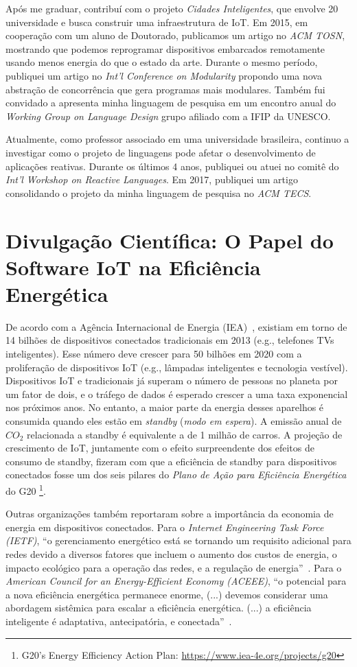 \documentclass[12pt,english]{amsart}
\begin{document}
Após me graduar, contribuí com o projeto \emph{Cidades Inteligentes}, que
envolve 20 universidade e busca construir uma infraestrutura de IoT.
%
Em 2015, em cooperação com um aluno de Doutorado, publicamos um artigo no
\emph{ACM TOSN}, mostrando que podemos reprogramar dispositivos embarcados
remotamente usando menos energia do que o estado da arte.
%
Durante o mesmo período, publiquei um artigo no
\emph{Int'l Conference on Modularity}
propondo uma nova abstração de concorrência que gera programas mais modulares.
%
Também fui convidado a apresenta minha linguagem de pesquisa em um encontro
anual do \emph{Working Group on Language Design} grupo afiliado com a IFIP da
UNESCO.

Atualmente, como professor associado em uma universidade brasileira, continuo
a investigar como o projeto de linguagens pode afetar o desenvolvimento de
aplicações reativas.
Durante os últimos 4 anos, publiquei ou atuei no comitê do
\emph{Int'l Workshop on Reactive Languages}.
Em 2017, publiquei um artigo consolidando o projeto da minha linguagem de
pesquisa no \emph{ACM TECS}.

\section{Divulgação Científica: O Papel do Software IoT na Eficiência Energética}

De acordo com a Agência Internacional de Energia (IEA)~\cite{iea.data},
existiam em torno de 14 bilhões de dispositivos conectados tradicionais em 2013
(e.g., telefones TVs inteligentes).
Esse número deve crescer para 50 bilhões em 2020 com a proliferação de
dispositivos IoT (e.g., lâmpadas inteligentes e tecnologia vestível).
%
Dispositivos IoT e tradicionais já superam o número de pessoas no planeta por
um fator de dois, e o tráfego de dados é esperado crescer a uma taxa
exponencial nos próximos anos.
%
No entanto, a maior parte da energia desses aparelhos é consumida quando eles
estão em \emph{standby} (\emph{modo em espera}).
%
A emissão anual de $CO_2$ relacionada a standby é equivalente a de 1 milhão de
carros.
%
A projeção de crescimento de IoT, juntamente com o efeito surpreendente dos
efeitos de consumo de standby, fizeram com que a eficiência de standby para
dispositivos conectados fosse um dos seis pilares do \emph{Plano de Ação para
Eficiência Energética} do G20%
\footnote{G20's Energy Efficiency Action Plan: \url{https://www.iea-4e.org/projects/g20}}.

Outras organizações também reportaram sobre a importância da economia de
energia em dispositivos conectados.
%
Para o \emph{Internet Engineering Task Force (IETF)}, ``o gerenciamento
energético está se tornando um requisito adicional para redes devido a diversos
fatores que incluem o aumento dos custos de energia, o impacto ecológico para
a operação das redes, e a regulação de energia''~\cite{ietf.eman}.
%
Para o \emph{American Council for an Energy-Efficient Economy (ACEEE)},
``o potencial para a nova eficiência energética permanece enorme, (...) devemos
considerar uma abordagem sistêmica para escalar a eficiência energética.
(...) a eficiência inteligente é adaptativa, antecipatória, e
conectada''~\cite{aceee.1}.
\end{document}
